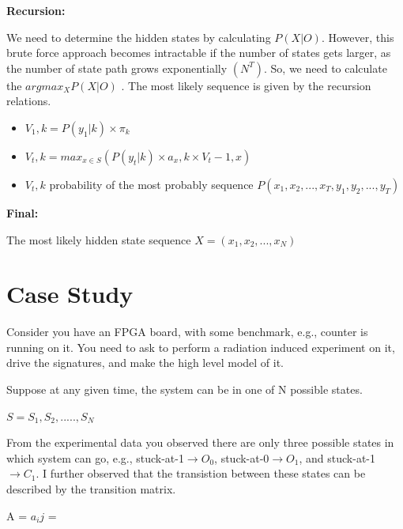 \textbf{Recursion:}

We need to determine the hidden states by calculating $P(X|O)$. However, this brute force approach becomes intractable if the number of states gets larger, as the number of state path grows exponentially $(N^T)$. So, we need to calculate the $argmax_X P(X|O)$ . The most likely sequence is given by the recursion relations.

\begin{center}

\begin{itemize}


\item $V_1,k = P (y_1|k) \times \pi_k$

\item $V_t,k = max_{x \in S} (P (y_t|k) \times a_x,k \times V_t-1,x)$

\item $V_t,k$ probability of the most probably sequence $P (x_1, x_2,...,x_T, y_1,y_2,...,y_T)$

\end{itemize}

\end{center}


\textbf{Final:}

The most likely hidden state sequence $X = (x_1,x_2,...,x_N)$ 

\section{Case Study}


Consider you have an FPGA board, with some benchmark, e.g., counter is running on it. You need to  ask to perform a radiation induced experiment on it, drive the signatures, and make the high level model of it.

Suppose at any given time, the system can be in one of N possible states.

\begin{center}
$S = {S_1, S_2,....., S_N}$
\end{center}

From the experimental data you observed there are only three possible states in which system can go, e.g., stuck-at-1$\rightarrow O_{0}$, stuck-at-0$\rightarrow O_{1}$, and stuck-at-1$\rightarrow C_{1}$. I further observed that the transistion between these states can be described by the transition matrix.


\begin{center}


A = {$a_ij$} = 
\end{center}


